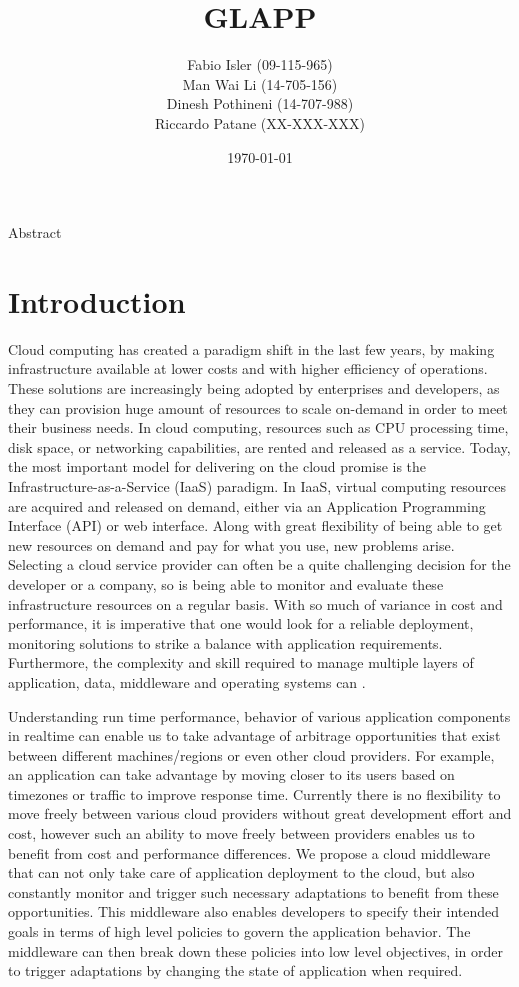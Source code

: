 \documentclass{seal_thesis}
\date{\today}
\title{GLAPP}
\subtitle{}
\author{
Fabio Isler \textmd{(09-115-965)} \\
Man Wai Li \textmd{(14-705-156)} \\
Dinesh Pothineni \textmd{(14-707-988)} \\
Riccardo Patane \textmd{(XX-XXX-XXX)}}
\begin{document}
\maketitle

\abstract
Abstract


\chapter{Introduction}\label{ch:introduction}

Cloud computing has created a paradigm shift in the last few years, by making infrastructure available at lower costs and with higher efficiency of operations.
These solutions are increasingly being adopted by enterprises and developers, as they can provision huge amount of resources to scale on-demand in order to meet their business needs.
In cloud computing, resources such as CPU processing time, disk space, or networking capabilities, are rented and released as a service.
Today, the most important model for delivering on the cloud promise is the Infrastructure-as-a-Service (IaaS) paradigm.
In IaaS, virtual computing resources are acquired and released on demand, either via an Application Programming Interface (API) or web interface.
Along with great flexibility of being able to get new resources on demand and pay for what you use, new problems arise.
Selecting a cloud service provider can often be a quite challenging decision for the developer or a company, so is being able to monitor and evaluate these infrastructure resources on a regular basis.
With so much of variance in cost and performance, it is imperative that one would look for a reliable deployment, monitoring solutions to strike a balance with application requirements.
Furthermore, the complexity and skill required to manage multiple layers of application, data, middleware and operating systems can .

Understanding run time performance, behavior of various application components in realtime can enable us to take advantage of arbitrage opportunities that exist between different machines/regions or even other cloud providers.
For example, an application can take advantage by moving closer to its users based on timezones or traffic to improve response time.
Currently there is no flexibility to move freely between various cloud providers without great development effort and cost, however such an ability to move freely between providers enables us to benefit from cost and performance differences.
We propose a cloud middleware that can not only take care of application deployment to the cloud, but also constantly monitor and trigger such necessary adaptations to benefit from these opportunities.
This middleware also enables developers to specify their intended goals in terms of high level policies to govern the application behavior.
The middleware can then break down these policies into low level objectives, in order to trigger adaptations by changing the state of application when required.
\end{document}
